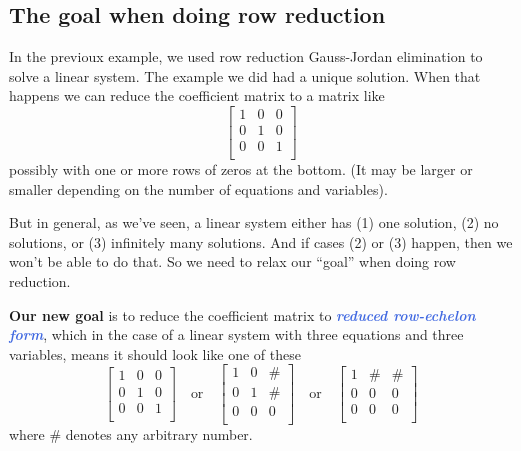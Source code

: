 \documentclass[10pt]{article}
\newcommand{\demph}[1]{\textcolor{RoyalBlue}{\textbf{\slshape #1}}} %
\theoremstyle{definition}
\begin{document}
\subsection{The goal when doing row reduction}
In the previoux example, we used row reduction Gauss-Jordan elimination to
solve a linear system. The example we did had a unique solution. When that
happens we can reduce the coefficient matrix to a matrix like
\begin{equation*}
  \begin{bmatrix}
    1&0&0\\
    0&1&0\\
    0&0&1\\
  \end{bmatrix}
\end{equation*}
possibly with one or more rows of zeros at the bottom. (It may be larger or
smaller depending on the number of equations and variables).

But in general, as we've seen, a linear system either has (1) one solution,
(2) no solutions, or (3) infinitely many solutions. And if cases (2) or (3)
happen, then we won't be able to do that. So we need to relax our ``goal''
when doing row reduction.

\textbf{Our new goal} is to reduce the coefficient matrix to \demph{reduced
  row-echelon form}, which in the case of a linear system with three equations
and three variables, means it should look like one of these
\begin{equation*}
  \begin{bmatrix}
    1&0&0\\
    0&1&0\\
    0&0&1\\
  \end{bmatrix}
  \quad \text{or} \quad
  \begin{bmatrix}
    1&0&\#\\
    0&1&\#\\
    0&0&0\\
  \end{bmatrix}
  \quad \text{or} \quad
  \begin{bmatrix}
    1&\#&\#\\
    0&0&0\\
    0&0&0\\
  \end{bmatrix}
\end{equation*}
where $\#$ denotes any arbitrary number.
\end{document}

